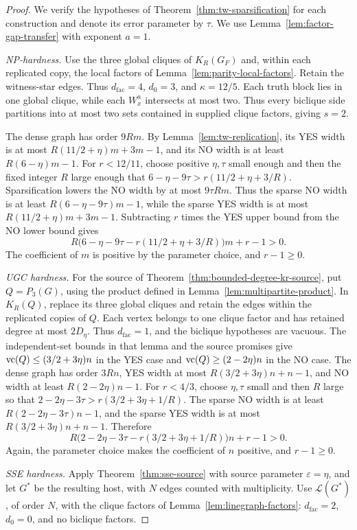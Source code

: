 \begin{proof}
We verify the hypotheses of Theorem~\ref{thm:tw-sparsification}
for each construction and denote its error parameter by $\tau$.
We use Lemma~\ref{lem:factor-gap-transfer} with exponent $a=1$.

\emph{\textup{NP}-hardness.}
Use the three global cliques of $K_R(G_F)$ and, within each
replicated copy, the local factors of
Lemma~\ref{lem:parity-local-factors}. Retain the witness-star edges.
Thus $d_{\mathrm{fac}}=4$, $d_0=3$, and $\kappa=12/5$.
Each truth block lies in one global clique, while each $W_x^a$
intersects at most two. Thus every biclique side partitions into at
most two sets contained in supplied clique factors, giving $s=2$.

The dense graph has order $9Rm$. By
Lemma~\ref{lem:tw-replication}, its YES width is at most
$R(11/2+\eta)m+3m-1$, and its NO width is at least
$R(6-\eta)m-1$. For $r<12/11$, choose positive $\eta,\tau$
small enough and then the fixed integer $R$ large enough that
$6-\eta-9\tau>r(11/2+\eta+3/R)$.
Sparsification lowers the NO width by at most $9\tau Rm$. Thus the
sparse NO width is at least $R(6-\eta-9\tau)m-1$, while the sparse
YES width is at most $R(11/2+\eta)m+3m-1$. Subtracting $r$ times
the YES upper bound from the NO lower bound gives
\[
 R\bigl(6-\eta-9\tau-r(11/2+\eta+3/R)\bigr)m+r-1>0.
\]
The coefficient of $m$ is positive by the parameter choice, and
$r-1\ge0$.

\emph{\textup{UGC} hardness.}
For the source of Theorem~\ref{thm:bounded-degree-kr-source}, put
$Q=P_3(G)$, using the product defined in
Lemma~\ref{lem:multipartite-product}. In $K_R(Q)$, replace its three global cliques
and retain the edges within the replicated copies of $Q$.
Each vertex belongs to one clique factor and has retained degree
at most $2D_\eta$. Thus $d_{\mathrm{fac}}=1$, and the biclique hypotheses are
vacuous. The independent-set bounds in that lemma and the source
promises give $\operatorname{vc}(Q)\le(3/2+3\eta)n$ in the YES case and
$\operatorname{vc}(Q)\ge(2-2\eta)n$ in the NO case.
The dense graph has order $3Rn$, YES width at most
$R(3/2+3\eta)n+n-1$, and NO width at least $R(2-2\eta)n-1$.
For $r<4/3$, choose $\eta,\tau$ small and then $R$ large so that
$2-2\eta-3\tau>r(3/2+3\eta+1/R)$.
The sparse NO width is at least $R(2-2\eta-3\tau)n-1$, and the
sparse YES width is at most $R(3/2+3\eta)n+n-1$. Therefore
\[
 R\bigl(2-2\eta-3\tau-r(3/2+3\eta+1/R)\bigr)n+r-1>0.
\]
Again, the parameter choice makes the coefficient of $n$ positive,
and $r-1\ge0$.

\emph{\textup{SSE} hardness.}
Apply Theorem~\ref{thm:sse-source} with source parameter
$\varepsilon=\eta$, and let $G^*$ be the resulting host, with $N$
edges counted with multiplicity. Use $\mathcal L(G^*)$, of order $N$,
with the clique factors of Lemma~\ref{lem:linegraph-factors}:
$d_{\mathrm{fac}}=2$, $d_0=0$, and no biclique factors.


\end{proof}

